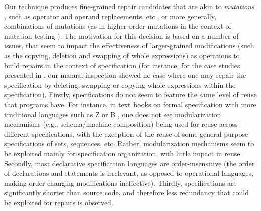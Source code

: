 Our technique produces fine-grained repair candidates that are akin to \emph{mutations} \cite{AmmannOffutt2008}, such as operator and operand replacements, etc., or more generally, combinations of mutations (as in higher order mutations in the context of mutation testing \cite{JiaHarman2009}). The motivation for this decision is based on a number of issues, that seem to impact the effectiveness of larger-grained modifications (such as the copying, deletion and swapping of whole expressions) as operations to build repairs in the context of specification (for instance, for the case studies presented in \cite{Wang+2019}, our manual inspection showed no case where one may repair the specification by deleting, swapping or copying whole expressions within the specification). Firstly, specifications do not seem to feature the same level of reuse that programs have. For instance, in text books on formal specification with more traditional languages such as Z \cite{DBLP:books/daglib/0072139} or B \cite{Abrial2005}, one does not see modularization mechanisms (e.g., schema/machine composition) being used for reuse across different specifications, with the exception of the reuse of some general purpose specifications of sets, sequences, etc. Rather, modularization mechanisms seem to be exploited mainly for specification organization, with little impact in reuse. Secondly, most declarative specification languages are order-insensitive (the order of declarations and statements is irrelevant, as opposed to operational languages, making order-changing modifications ineffective). Thirdly, specifications are significantly shorter than source code, and therefore less redundancy that could be exploited for repairs is observed. 


